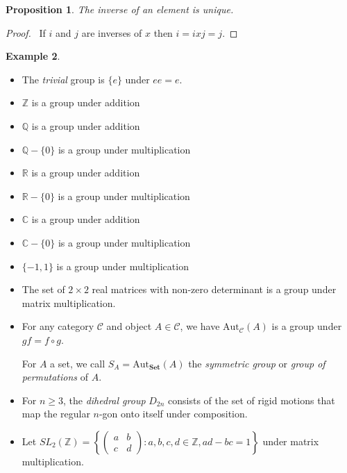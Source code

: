 \documentclass{book}
\let\qed\relax
\newtheorem{prop}{Proposition}[chapter]
\theoremstyle{definition}
\newtheorem{ex}[prop]{Example}
\newcommand{\Aut}[2]{\ensuremath{\mathrm{Aut}_{#1} \left( {#2} \right)}}
\newcommand{\Set}{\ensuremath{\mathbf{Set}}}
\begin{document}
\begin{prop}
    \label{prop:grp-inv-unique}
    The inverse of an element is unique.
\end{prop}

\begin{proof}
    \pf\ If $i$ and $j$ are inverses of $x$ then $i = ixj = j$. \qed
\end{proof}

\begin{ex}
    \begin{itemize}
        \item
              The \emph{trivial} group is $\{e\}$ under $ee = e$.
        \item $\mathbb{Z}$ is a group under addition %
        \item $\mathbb{Q}$ is a group under addition %
        \item $\mathbb{Q} - \{0\}$ is a group under multiplication
        \item $\mathbb{R}$ is a group under addition %
        \item $\mathbb{R} - \{0\}$ is a group under multiplication
        \item $\mathbb{C}$ is a group under addition %
        \item $\mathbb{C} - \{0\}$ is a group under multiplication
        \item $\{-1,1\}$ is a group under multiplication
        \item The set of $2 \times 2$ real matrices with non-zero determinant is a group
              under matrix multiplication.
        \item For any category $\mathcal{C}$ and object $A \in \mathcal{C}$, we have
              $\Aut{\mathcal{C}}{A}$ is a group under $gf = f \circ g$.

              For $A$ a set, we call $S_A = \Aut{\Set}{A}$ the \emph{symmetric group} or
              \emph{group of permutations} of $A$.

        \item For $n \geq 3$, the \emph{dihedral group} $D_{2n}$ consists of the set of rigid
              motions that map the regular $n$-gon onto itself under composition.
              \item Let $SL_2(\mathbb{Z}) = \left\{ \left( \begin{array}{cc}
              a & b \\
              c & d \end{array} \right)
              : a,b,c,d \in \mathbb{Z}, ad - bc = 1 \right\}$ under matrix multiplication.
    \end{itemize}
\end{ex}
\end{document}
